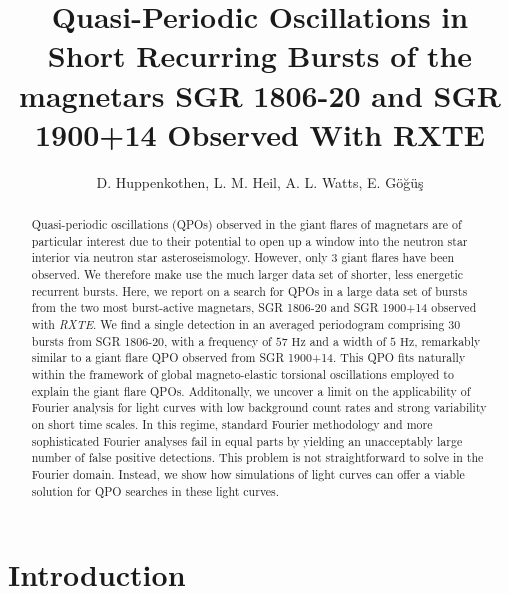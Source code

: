 \documentclass[numberedappendix]{emulateapj}
\newcommand{\hz}{\,\mathrm{Hz}}
\newcommand{\project}[1]{\textsl{#1}}
\newcommand{\rxte}{\project{RXTE}}
\begin{document}
\title{Quasi-Periodic Oscillations in Short Recurring Bursts of the magnetars SGR 1806-20 and SGR 1900+14 Observed With RXTE}

\author{D. Huppenkothen, L. M. Heil, A. L. Watts,  E. G{\"o}{\u g}{\"u}{\c s}}

 


\begin{abstract}

Quasi-periodic oscillations (QPOs) observed in the giant flares of magnetars are of particular interest due to their potential to open up
a window into the neutron star interior via neutron star asteroseismology. However, only $3$ giant flares have been observed. We
therefore make use the much larger data set of shorter, less energetic recurrent bursts. Here, we report on a search for QPOs in a large data set of bursts from
the two most burst-active magnetars, SGR 1806-20 and SGR 1900+14 observed with \rxte. We find a single detection in an averaged periodogram 
comprising $30$ bursts from SGR 1806-20, with a frequency of $57\,\hz$ and a width of $5\,\hz$, remarkably similar to a giant flare
QPO observed from SGR 1900+14. This QPO fits naturally within the framework of global magneto-elastic torsional oscillations 
employed to explain the giant flare QPOs. Additonally, we uncover a limit on the applicability of Fourier analysis for light curves 
with low background count rates and strong variability on short time scales. In this regime, standard Fourier methodology and
more sophisticated Fourier analyses fail in equal parts by yielding an unacceptably large number of false positive detections. 
This problem is not straightforward to solve in the Fourier domain. Instead, we show how simulations of light curves can offer
a viable solution for QPO searches in these light curves.

\end{abstract}




\section{Introduction}
\end{document}
